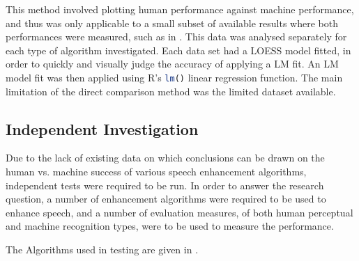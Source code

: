 This method involved plotting human performance against machine performance,
and thus was only applicable to a small subset of available results
where both performances were measured, such as in \citep{Paliwal2010}.
This data was analysed separately for each type of algorithm investigated.
Each data set had a \ac{LOESS} model fitted, in order to quickly
and visually judge the accuracy of applying a \ac{LM} fit. An \ac{LM}
model fit was then applied using R's \lstinline[language=R]!lm()!
linear regression function. The main limitation of the direct comparison
method was the limited dataset available.


\subsection{\label{sub:Independent-Investigation-Meth}Independent Investigation}

Due to the lack of existing data on which conclusions can be drawn
on the human vs. machine success of various speech enhancement algorithms,
independent tests were required to be run. In order to answer the
research question, a number of enhancement algorithms were required
to be used to enhance speech, and a number of evaluation measures,
of both human perceptual and machine recognition types, were to be
used to measure the performance.

The Algorithms used in testing are given in .

